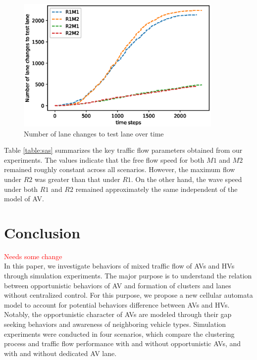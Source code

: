 \documentclass[oneside,letter,11pt]{article}
\begin{document}
\begin{figure}[H]
\centering
  \includegraphics[width= 10cm]{lanecomprv.eps}
  \vspace{-0.6cm}
  \caption{Number of lane changes to test lane over time}
    \vspace{-0.2cm}
  \label{fig:lamndtri}
\end{figure}


Table \ref{table:sas} summarizes the key traffic flow parameters obtained from our experiments. The values indicate that the free flow speed for both $M1$ and $M2$ remained roughly constant across all scenarios. However, the maximum flow under $R2$ was greater than that under $R1$. On the other hand, the wave speed under both $R1$ and $R2$ remained approximately the same independent of the model of AV.


\section{\textbf{Conclusion}}
\textcolor{red}{Needs some change \\}
In this paper, we investigate behaviors of mixed traffic flow of AVs and HVs through simulation experiments. The major purpose is to understand the relation between opportunistic behaviors of AV and formation of clusters and lanes without centralized control. For this purpose, we propose a new cellular automata model to account for potential behaviors difference between AVs and HVs. Notably, the opportunistic character of AVs are modeled through their gap seeking behaviors and awareness of neighboring vehicle types. Simulation experiments were conducted in four scenarios, which compare the clustering process and traffic flow performance with and without opportunistic AVs, and with and without dedicated AV lane.
\end{document}
